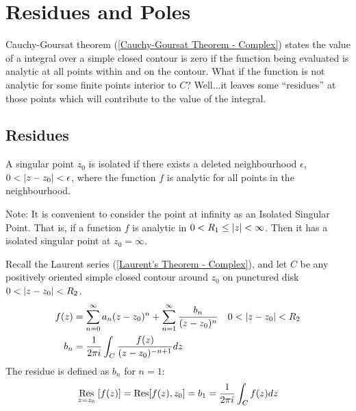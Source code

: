 \documentclass[12pt, english]{book}
\begin{document}


	\chapter{Residues and Poles} \label{Residues and Poles Chapter - Complex}
	
	Cauchy-Goursat theorem (\cref{Cauchy-Goursat Theorem - Complex}) states the value of a integral over a simple closed contour is zero if the function being evaluated is analytic at all points within and on the contour. What if the function is not analytic for some finite points interior to \(C\)? Well...it leaves some ``residues'' at those points which will contribute to the value of the integral.
	
	\section{Residues} \label{Residues Section - Complex}
	
	\begin{definition}
		\label{Isolated Singular Points Definition - Complex}
		A singular point \(z_0\) is isolated if there exists a deleted neighbourhood \(\epsilon\), \(0 < \abs{z-z_0}< \epsilon\), where the function \(f\) is analytic for all points in the neighbourhood.
	\end{definition}

	Note: It is convenient to consider the point at infinity as an Isolated Singular Point. That is, if a function \(f\) is analytic in \(0<R_1 \leq \abs{z} < \infty\). Then it has a isolated singular point at \(z_0 = \infty\).
	
	\begin{definition}[Residue]
		Recall the Laurent series (\cref{Laurent's Theorem - Complex}), and let \(C\) be any positively oriented simple closed contour around \(z_0\) on punctured disk \(0 < \abs{z-z_0}< R_2\).  
		\begin{align*}
			f(z) &= \sum_{n=0}^{\infty} a_n (z-z_0)^n + \sum_{n=1}^{\infty} \frac{b_n}{(z-z_0)^n}
				& 0 < \abs{z-z_0} < R_2\\
			b_n &= \frac{1}{2\pi i} \int_{C} \frac{f(z)}{(z-z_0)^{-n+1}} dz
		\end{align*}
		The residue is defined as \(b_n\) for \(n=1\):
		\begin{align*}
			\underset{z=z_0}{\Res}[f(z)]
			= \Res[f(z), z_0] = b_1 = \frac{1}{2\pi i} \int_{C} f(z) dz
		\end{align*}
	\end{definition}
	
\end{document}
